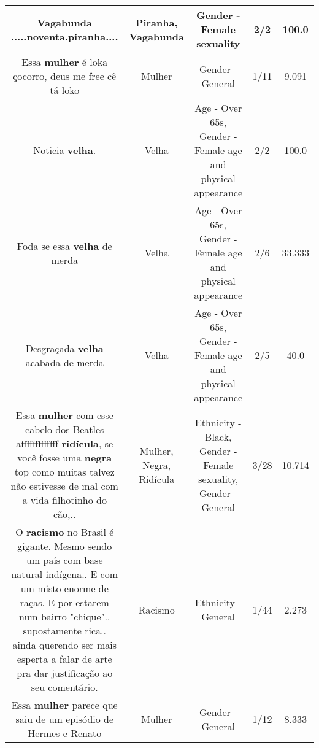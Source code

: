 \documentclass[11pt]{article}
\newlength\mylength
\begin{document}
\begin{center}
\begin{longtable}{|C{.65\mylength}|C{.30\mylength}|C{.12\mylength}|C{.12\mylength}|C{.12\mylength}|}
  \small Vagabunda .....noventa.\textbf{piranha}....\normalsize   & Piranha, Vagabunda & Gender - Female sexuality & 2/2 & 100.0 \\  \hline
  \small Essa \textbf{mulher} é loka çocorro, deus me free cê tá loko\normalsize   & Mulher & Gender - General & 1/11 & 9.091 \\  \hline
  \small Noticia \textbf{v\textbf{elha}}.\normalsize   & Velha & Age - Over 65s, Gender - Female age and physical appearance & 2/2 & 100.0 \\  \hline
  \small Foda se essa \textbf{v\textbf{elha}} de merda\normalsize   & Velha & Age - Over 65s, Gender - Female age and physical appearance & 2/6 & 33.333 \\  \hline
  \small Desgraçada \textbf{v\textbf{elha}} acabada de merda\normalsize   & Velha & Age - Over 65s, Gender - Female age and physical appearance & 2/5 & 40.0 \\  \hline
  \small Essa \textbf{mulher} com esse cabelo dos Beatles afffffffffffff \textbf{ridícula}, se você fosse uma \textbf{negra} top como muitas talvez não estivesse de mal com a vida filhotinho do cão,..\normalsize   & Mulher, Negra, Ridícula & Ethnicity - Black, Gender - Female sexuality, Gender - General & 3/28 & 10.714 \\  \hline
  \small O \textbf{racismo} no Brasil é gigante. Mesmo sendo um país com base natural indígena.. E com um misto enorme de raças. E por estarem num bairro "chique".. supostamente rica.. ainda querendo ser mais esperta a falar de arte pra dar justificação ao seu comentário.\normalsize   & Racismo & Ethnicity - General & 1/44 & 2.273 \\  \hline
  \small Essa \textbf{mulher} parece que saiu de um episódio de Hermes e Renato\normalsize   & Mulher & Gender - General & 1/12 & 8.333 \\  \hline

\end{longtable}
\end{center}
\end{document}

